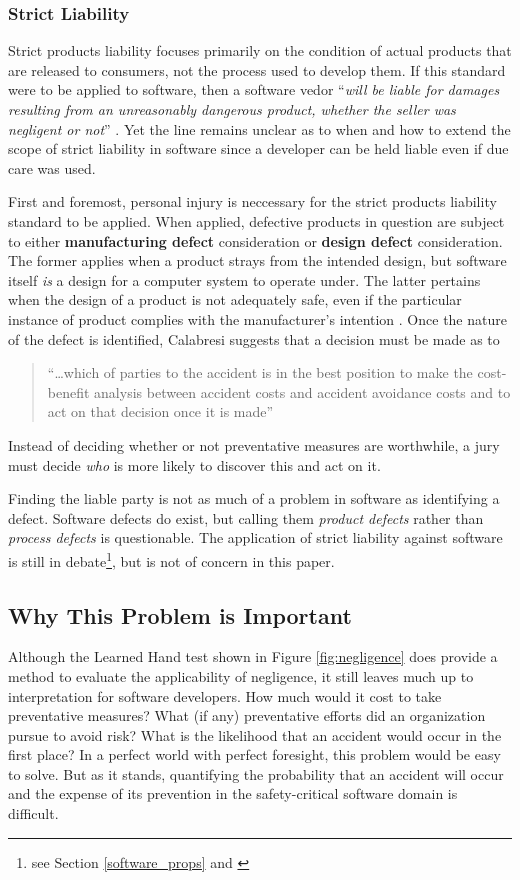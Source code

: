 \subsubsection{Strict Liability}
Strict products liability focuses primarily on the condition of actual products
that are released to consumers, not the process used to develop them. If this
standard were to be applied to software, then a software vedor ``\textit{will be
liable for damages resulting from an unreasonably dangerous product, whether the
seller was negligent or not}'' \cite{Burgunder2004}. Yet the line remains
unclear as to when and how to extend the scope of strict liability in software 
since a developer can be held liable even if due care was used.

First and foremost, personal injury is neccessary for the strict products
liability standard to be applied. When applied, defective products in question
are subject to either \textbf{manufacturing defect} consideration or
\textbf{design defect} consideration. The former applies when a product strays
from the intended design, but software itself \textit{is} a design for a
computer system to operate under. The latter pertains when the design of a
product is not adequately safe, even if the particular instance of product
complies with the manufacturer's intention \cite{Turner1999}. Once the nature of
the defect is identified, Calabresi suggests that  a decision must be made as to

\begin{quote}
``\ldots which of parties to the accident is in the best position to make the
cost-benefit analysis between accident costs and accident avoidance costs and to
act on that decision once it is made'' \cite{Calabresi1972}
\end{quote}
 Instead of deciding whether or not preventative
measures are worthwhile, a jury must decide \textit{who} is more likely to 
discover this and act on it.

Finding the liable party is not as much of a problem in software as identifying
a defect. Software defects do exist, but calling them \textit{product defects} 
rather than \textit{process defects} is questionable. The application of strict
liability against software is still in debate\footnote{see Section
\ref{software_props} and \cite{Turner2000}}, but is not of concern in this
paper.

\subsection{Why This Problem is Important}
Although the Learned Hand test shown in Figure \ref{fig:negligence} does provide
a method to evaluate the applicability of negligence, it still leaves much up to
interpretation for software developers. How much would it cost to take preventative
measures? What (if any) preventative efforts did an organization pursue to avoid
risk? What is the likelihood that an accident would occur in the first place? In
a perfect world with perfect foresight, this problem would be easy to solve. But
as it stands, quantifying the probability that an accident will occur and the
expense of its prevention in the safety-critical software domain is difficult.

